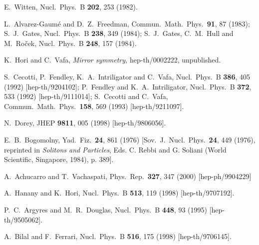 \documentclass[12pt,epsf]{article}
\begin{document}
\begin{thebibliography}{99}
E.~Witten,
Nucl.\ Phys.\ B {\bf 202}, 253 (1982).

L.~Alvarez-Gaum\'{e} and D.~Z.~Freedman,
Commun.\ Math.\ Phys.\  {\bf 91}, 87 (1983);
S.~J.~Gates,
Nucl.\ Phys.\ B {\bf 238}, 349 (1984);
S.~J.~Gates, C.~M.~Hull and M.~Ro\v{c}ek,
Nucl.\ Phys.\ B {\bf 248}, 157 (1984).

K.~Hori and C.~Vafa,
{\em Mirror symmetry,}
hep-th/0002222, unpublished.

S.~Cecotti, P.~Fendley, K.~A.~Intriligator and C.~Vafa,
Nucl.\ Phys.\ B {\bf 386}, 405 (1992)
[hep-th/9204102];
P.~Fendley and K.~A.~Intriligator,
Nucl.\ Phys.\ B {\bf 372}, 533 (1992)
[hep-th/9111014];
S.~Cecotti and C.~Vafa,
Commun.\ Math.\ Phys.\  {\bf 158}, 569 (1993)
[hep-th/9211097].%



N.~Dorey,
JHEP {\bf 9811}, 005 (1998) [hep-th/9806056].

E.~B.~Bogomolny,
Yad.\ Fiz.\  {\bf 24}, 861 (1976) [Sov.\ J.\ Nucl.\ Phys.\
{\bf 24}, 449 (1976),
reprinted in {\em Solitons and Particles}, Eds. C. Rebbi and G. Soliani
(World Scientific, Singapore, 1984), p. 389].



A.~Achucarro and T.~Vachaspati,
Phys.\ Rep.\  {\bf 327}, 347 (2000)
[hep-ph/9904229]

A.~Hanany and K.~Hori,
Nucl.\ Phys.\ B {\bf 513}, 119 (1998) [hep-th/9707192].


P.~C.~Argyres and M.~R.~Douglas,
Nucl.\ Phys.\ B {\bf 448}, 93 (1995)
[hep-th/9505062].

A.~Bilal and F.~Ferrari,
Nucl.\ Phys.\ B {\bf 516}, 175 (1998)
[hep-th/9706145].



\end{thebibliography}
\end{document}
